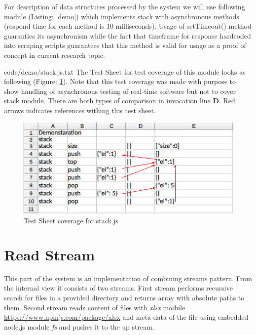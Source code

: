 For description of data structures processed by the system we will use following module (Listing: \ref{demo}) which implements stack with asynchronous methods (respond time for each method is 10 milliseconds). Usage of setTimeout() method guaranties its asynchronism while the fact that timeframe for response hardcoded into scraping scripts guarantees that this method is valid for usage as a proof of concept in current research topic.

{code/demo/stack.js.txt}
The Test Sheet for test coverage of this module looks as following (Figure: \ref{fig:demoTS}). Note that this test coverage was made with purpose to show handling of asynchronous testing of real-time software but not to cover stack module. There are both types of comparison in invocation line \textbf{D}. Red arrows indicates references withing this test sheet.
\begin{figure}[H]
\centering
\includegraphics[width=\linewidth]{grafiken/demoTS.pdf}
\caption{Test Sheet coverage for stack.js}
\label{fig:demoTS}
\end{figure}



\section{Read Stream}

This part of the system is an implementation of combining streams pattern. From the internal view it consists of two streams. First stream performs recursive search for files in a provided directory and returns array with absolute paths to them. Second stream reads content of files with \textit{xlsx} module \url{https://www.npmjs.com/package/xlsx} and meta data of the file using embedded node.js module \textit{fs} and pushes it to the up stream.


